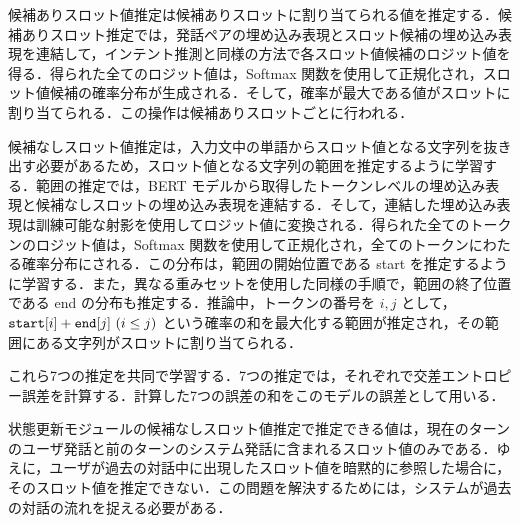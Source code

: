 \par
候補ありスロット値推定は候補ありスロットに割り当てられる値を推定する．候補ありスロット推定では，発話ペアの埋め込み表現とスロット候補の埋め込み表現を連結して，インテント推測と同様の方法で各スロット値候補のロジット値を得る．得られた全てのロジット値は，Softmax 関数を使用して正規化され，スロット値候補の確率分布が生成される．そして，確率が最大である値がスロットに割り当てられる．この操作は候補ありスロットごとに行われる．
\par
候補なしスロット値推定は，入力文中の単語からスロット値となる文字列を抜き出す必要があるため，スロット値となる文字列の範囲を推定するように学習する．範囲の推定では，BERT モデルから取得したトークンレベルの埋め込み表現と候補なしスロットの埋め込み表現を連結する．そして，連結した埋め込み表現は訓練可能な射影を使用してロジット値に変換される．得られた全てのトークンのロジット値は，Softmax 関数を使用して正規化され，全てのトークンにわたる確率分布にされる．この分布は，範囲の開始位置である start を推定するように学習する．また，異なる重みセットを使用した同様の手順で，範囲の終了位置である end の分布も推定する．推論中，トークンの番号を $i,j$ として，$\verb|start|[i] + \verb|end|[j] \ (i \leq j)$ という確率の和を最大化する範囲が推定され，その範囲にある文字列がスロットに割り当てられる．
\par
これら7つの推定を共同で学習する．7つの推定では，それぞれで交差エントロピー誤差を計算する．計算した7つの誤差の和をこのモデルの誤差として用いる．
\par
状態更新モジュールの候補なしスロット値推定で推定できる値は，現在のターンのユーザ発話と前のターンのシステム発話に含まれるスロット値のみである．ゆえに，ユーザが過去の対話中に出現したスロット値を暗黙的に参照した場合に，そのスロット値を推定できない．この問題を解決するためには，システムが過去の対話の流れを捉える必要がある．